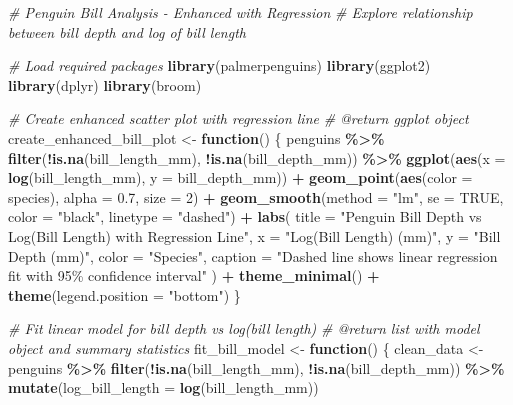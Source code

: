 \documentclass[
]{article}
\newenvironment{Shaded}{\begin{snugshade}}{\end{snugshade}}
\newcommand{\AttributeTok}[1]{\textcolor[rgb]{0.13,0.29,0.53}{#1}}
\newcommand{\CommentTok}[1]{\textcolor[rgb]{0.56,0.35,0.01}{\textit{#1}}}
\newcommand{\ConstantTok}[1]{\textcolor[rgb]{0.56,0.35,0.01}{#1}}
\newcommand{\ControlFlowTok}[1]{\textcolor[rgb]{0.13,0.29,0.53}{\textbf{#1}}}
\newcommand{\DecValTok}[1]{\textcolor[rgb]{0.00,0.00,0.81}{#1}}
\newcommand{\FloatTok}[1]{\textcolor[rgb]{0.00,0.00,0.81}{#1}}
\newcommand{\FunctionTok}[1]{\textcolor[rgb]{0.13,0.29,0.53}{\textbf{#1}}}
\newcommand{\NormalTok}[1]{#1}
\newcommand{\OtherTok}[1]{\textcolor[rgb]{0.56,0.35,0.01}{#1}}
\newcommand{\SpecialCharTok}[1]{\textcolor[rgb]{0.81,0.36,0.00}{\textbf{#1}}}
\newcommand{\StringTok}[1]{\textcolor[rgb]{0.31,0.60,0.02}{#1}}
\begin{document}
\begin{Shaded}
\begin{Highlighting}[]
\CommentTok{\#\textquotesingle{} Penguin Bill Analysis {-} Enhanced with Regression}
\CommentTok{\#\textquotesingle{} Explore relationship between bill depth and log of bill length}

\CommentTok{\# Load required packages}
\FunctionTok{library}\NormalTok{(palmerpenguins)}
\FunctionTok{library}\NormalTok{(ggplot2)}
\FunctionTok{library}\NormalTok{(dplyr)}
\FunctionTok{library}\NormalTok{(broom)}

\CommentTok{\#\textquotesingle{} Create enhanced scatter plot with regression line}
\CommentTok{\#\textquotesingle{} @return ggplot object}
\NormalTok{create\_enhanced\_bill\_plot }\OtherTok{\textless{}{-}} \ControlFlowTok{function}\NormalTok{() \{}
\NormalTok{  penguins }\SpecialCharTok{\%\textgreater{}\%}
    \FunctionTok{filter}\NormalTok{(}\SpecialCharTok{!}\FunctionTok{is.na}\NormalTok{(bill\_length\_mm), }\SpecialCharTok{!}\FunctionTok{is.na}\NormalTok{(bill\_depth\_mm)) }\SpecialCharTok{\%\textgreater{}\%}
    \FunctionTok{ggplot}\NormalTok{(}\FunctionTok{aes}\NormalTok{(}\AttributeTok{x =} \FunctionTok{log}\NormalTok{(bill\_length\_mm), }\AttributeTok{y =}\NormalTok{ bill\_depth\_mm)) }\SpecialCharTok{+}
    \FunctionTok{geom\_point}\NormalTok{(}\FunctionTok{aes}\NormalTok{(}\AttributeTok{color =}\NormalTok{ species), }\AttributeTok{alpha =} \FloatTok{0.7}\NormalTok{, }\AttributeTok{size =} \DecValTok{2}\NormalTok{) }\SpecialCharTok{+}
    \FunctionTok{geom\_smooth}\NormalTok{(}\AttributeTok{method =} \StringTok{"lm"}\NormalTok{, }\AttributeTok{se =} \ConstantTok{TRUE}\NormalTok{, }\AttributeTok{color =} \StringTok{"black"}\NormalTok{, }\AttributeTok{linetype =} \StringTok{"dashed"}\NormalTok{) }\SpecialCharTok{+}
    \FunctionTok{labs}\NormalTok{(}
      \AttributeTok{title =} \StringTok{"Penguin Bill Depth vs Log(Bill Length) with Regression Line"}\NormalTok{,}
      \AttributeTok{x =} \StringTok{"Log(Bill Length) (mm)"}\NormalTok{,}
      \AttributeTok{y =} \StringTok{"Bill Depth (mm)"}\NormalTok{,}
      \AttributeTok{color =} \StringTok{"Species"}\NormalTok{,}
      \AttributeTok{caption =} \StringTok{"Dashed line shows linear regression fit with 95\% confidence interval"}
\NormalTok{    ) }\SpecialCharTok{+}
    \FunctionTok{theme\_minimal}\NormalTok{() }\SpecialCharTok{+}
    \FunctionTok{theme}\NormalTok{(}\AttributeTok{legend.position =} \StringTok{"bottom"}\NormalTok{)}
\NormalTok{\}}

\CommentTok{\#\textquotesingle{} Fit linear model for bill depth vs log(bill length)}
\CommentTok{\#\textquotesingle{} @return list with model object and summary statistics}
\NormalTok{fit\_bill\_model }\OtherTok{\textless{}{-}} \ControlFlowTok{function}\NormalTok{() \{}
\NormalTok{  clean\_data }\OtherTok{\textless{}{-}}\NormalTok{ penguins }\SpecialCharTok{\%\textgreater{}\%}
    \FunctionTok{filter}\NormalTok{(}\SpecialCharTok{!}\FunctionTok{is.na}\NormalTok{(bill\_length\_mm), }\SpecialCharTok{!}\FunctionTok{is.na}\NormalTok{(bill\_depth\_mm)) }\SpecialCharTok{\%\textgreater{}\%}
    \FunctionTok{mutate}\NormalTok{(}\AttributeTok{log\_bill\_length =} \FunctionTok{log}\NormalTok{(bill\_length\_mm))}
  

\end{Highlighting}
\end{Shaded}
\end{document}
